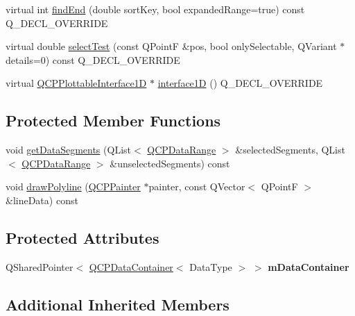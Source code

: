 \begin{DoxyCompactItemize}
\item 
virtual int \hyperlink{classQCPAbstractPlottable1D_a6e3ba20c9160d7361e58070390d10b1a}{find\+End} (double sort\+Key, bool expanded\+Range=true) const Q\+\_\+\+D\+E\+C\+L\+\_\+\+O\+V\+E\+R\+R\+I\+DE
\item 
virtual double \hyperlink{classQCPAbstractPlottable1D_a4611b43bcb6441b2154eb4f4e0a33db2}{select\+Test} (const Q\+PointF \&pos, bool only\+Selectable, Q\+Variant $\ast$details=0) const Q\+\_\+\+D\+E\+C\+L\+\_\+\+O\+V\+E\+R\+R\+I\+DE
\item 
virtual \hyperlink{classQCPPlottableInterface1D}{Q\+C\+P\+Plottable\+Interface1D} $\ast$ \hyperlink{classQCPAbstractPlottable1D_ac58fb47bfe330f6931ed8e64326387d7}{interface1D} () Q\+\_\+\+D\+E\+C\+L\+\_\+\+O\+V\+E\+R\+R\+I\+DE
\end{DoxyCompactItemize}
\subsection*{Protected Member Functions}
\begin{DoxyCompactItemize}
\item 
void \hyperlink{classQCPAbstractPlottable1D_a966cb165fb1dfc561d923dc6f8b149ea}{get\+Data\+Segments} (Q\+List$<$ \hyperlink{classQCPDataRange}{Q\+C\+P\+Data\+Range} $>$ \&selected\+Segments, Q\+List$<$ \hyperlink{classQCPDataRange}{Q\+C\+P\+Data\+Range} $>$ \&unselected\+Segments) const 
\item 
void \hyperlink{classQCPAbstractPlottable1D_afcc3d512b172721356003a318e0e4c88}{draw\+Polyline} (\hyperlink{classQCPPainter}{Q\+C\+P\+Painter} $\ast$painter, const Q\+Vector$<$ Q\+PointF $>$ \&line\+Data) const 
\end{DoxyCompactItemize}
\subsection*{Protected Attributes}
\begin{DoxyCompactItemize}
\item 
Q\+Shared\+Pointer$<$ \hyperlink{classQCPDataContainer}{Q\+C\+P\+Data\+Container}$<$ Data\+Type $>$ $>$ {\bfseries m\+Data\+Container}\hypertarget{classQCPAbstractPlottable1D_ac139cf70590707a1fb40eabe97fac246}{}\label{classQCPAbstractPlottable1D_ac139cf70590707a1fb40eabe97fac246}

\end{DoxyCompactItemize}
\subsection*{Additional Inherited Members}


